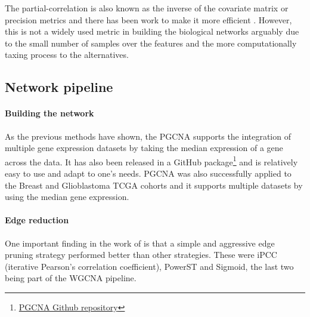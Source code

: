 The partial-correlation is also known as the inverse of the covariate matrix or precision metrics and there has been work to make it more efficient \citet{Ghanbari2019-tq}. However, this is not a widely used metric in building the biological networks arguably due to the small number of samples over the features and the more computationally taxing process to the alternatives.

\subsection{Network pipeline}

\vspace{3mm}
\vspace{3mm}

\paragraph*{Building the network} 

As the previous methods have shown, the PGCNA supports the integration of multiple gene expression datasets by taking the median expression of a gene across the data. It has also been released in a GitHub package\footnote{\href{https://github.com/medmaca/PGCNA}{PGCNA Github repository}} and is relatively easy to use and adapt to one's needs. PGCNA was also successfully applied to the Breast and Glioblastoma TCGA cohorts and it supports multiple datasets by using the median gene expression.

\paragraph*{Edge reduction}

One important finding in the work of \citet{Care2019-ij} is that a simple and aggressive edge pruning strategy performed better than other strategies. These were iPCC (iterative Pearson’s correlation coefficient), PowerST and Sigmoid, the last two being part of the WGCNA pipeline.

